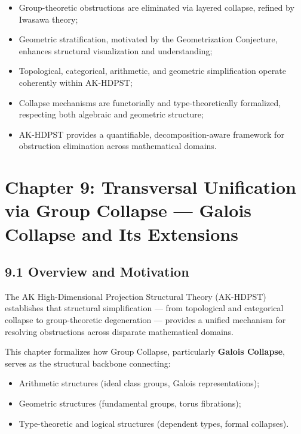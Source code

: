 \documentclass[11pt]{article}
\begin{document}
\begin{itemize}
    \item Group-theoretic obstructions are eliminated via layered collapse, refined by Iwasawa theory;
    \item Geometric stratification, motivated by the Geometrization Conjecture, enhances structural visualization and understanding;
    \item Topological, categorical, arithmetic, and geometric simplification operate coherently within AK-HDPST;
    \item Collapse mechanisms are functorially and type-theoretically formalized, respecting both algebraic and geometric structure;
    \item AK-HDPST provides a quantifiable, decomposition-aware framework for obstruction elimination across mathematical domains.
\end{itemize}





\section{Chapter 9: Transversal Unification via Group Collapse — Galois Collapse and Its Extensions}

\subsection*{9.1 Overview and Motivation}

The AK High-Dimensional Projection Structural Theory (AK-HDPST) establishes that structural simplification — from topological and categorical collapse to group-theoretic degeneration — provides a unified mechanism for resolving obstructions across disparate mathematical domains.

This chapter formalizes how Group Collapse, particularly \textbf{Galois Collapse}, serves as the structural backbone connecting:

\begin{itemize}
    \item Arithmetic structures (ideal class groups, Galois representations);
    \item Geometric structures (fundamental groups, torus fibrations);
    \item Type-theoretic and logical structures (dependent types, formal collapses).
\end{itemize}
\end{document}
